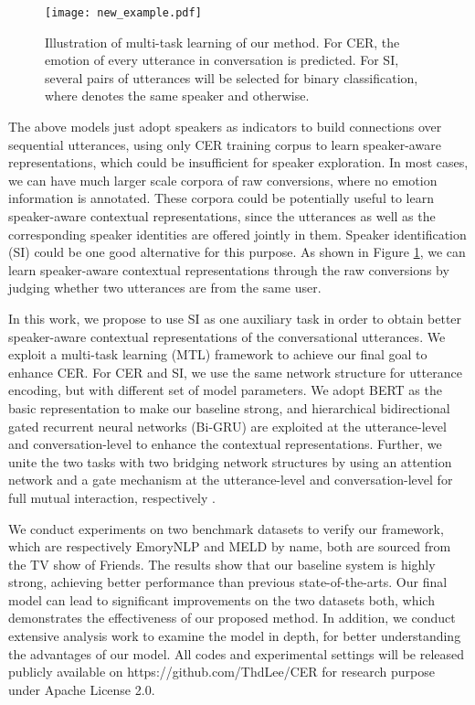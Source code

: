 \documentclass{article}
\begin{document}
\begin{CJK}{UTF8}{gbsn}
\begin{figure}[tb]
  \centering
  \texttt{[image: new\_example.pdf]}
  \caption{Illustration of multi-task learning of our method. For CER, the emotion of every utterance in conversation is predicted. For SI, several pairs of utterances will be selected for binary classification, where  denotes the same speaker and  otherwise. }
  \label{figure_example}
\end{figure}

The above models just adopt speakers as indicators to build connections over sequential utterances,
using only CER training corpus to learn speaker-aware representations,
which could be insufficient for speaker exploration.
In most cases, we can have much larger scale corpora of raw conversions, where no emotion information is annotated.
These corpora could be potentially useful to learn speaker-aware contextual representations,
since the utterances as well as the corresponding speaker identities are offered jointly in them. 
Speaker identification (SI) could be one good alternative for this purpose.
As shown in Figure \ref{figure_example}, 
we can learn speaker-aware contextual representations through the raw conversions by judging 
whether two utterances are from the same user.



In this work, we propose to use SI as one auxiliary task in order to obtain better speaker-aware contextual representations of the conversational utterances.
We exploit a multi-task learning (MTL) framework to achieve our final goal to enhance CER.
For CER and SI, we use the same network structure for utterance encoding,
but with different set of model parameters.
We adopt BERT as the basic representation to make our baseline strong,
and hierarchical bidirectional gated recurrent neural networks (Bi-GRU) are exploited 
at the utterance-level and conversation-level to enhance the contextual representations.
Further, we unite the two tasks  with two bridging network structures by using an attention network \cite{bahdanau2014neural} and a gate mechanism \cite{wu2019different}  at the utterance-level and conversation-level for full mutual interaction, respectively . 





We conduct experiments on two benchmark datasets to verify our framework, 
which are respectively EmoryNLP and MELD by name, 
both are sourced from the TV show of Friends.
The results show that our baseline system is highly strong,
achieving better performance than previous state-of-the-arts. 
Our final model can lead to significant improvements on the two datasets both,
which demonstrates the effectiveness of our proposed method.
In addition, we conduct extensive analysis work to examine the model in depth,
for better understanding the advantages of our model. 
All codes and experimental settings will be released publicly available on https://github.com/ThdLee/CER for research purpose under Apache License 2.0.






\end{CJK}
\end{document}
